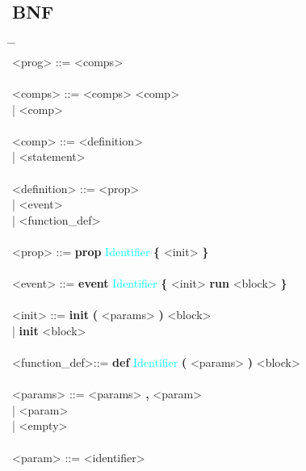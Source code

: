 \documentclass{Dokumentmall}
\begin{document}
\subsection{BNF}

\begin{tabbing}
  \= {} {} {} {} {} {} {} {} {} {} {} {} {} {} {} {} {} {} {} {} {} {} {} {} {} {} {} \= {} {} {} {} {} {} {} {} {} {} {} {} {} {} {} {} {} {}\= \\
  \><prog> \>::= \><comps> \\\\
  \><comps>  \>::= \><comps> <comp>\\
  \> \> | \> <comp> \\\\

  \><comp> \>::= \><definition>\\
  \> \>| \><statement>\\\\

  \><definition> \>::= \><prop>\\
  \> \>| \> <event> \\
  \> \>| \> <function\_def>\\\\

  \><prop> \>::= \>\textbf{prop} \textcolor{Cyan}{Identifier} \textbf{\{} <init> \textbf{\}}\\\\

  \><event> \>::= \>\textbf{event} \textcolor{Cyan}{Identifier} \textbf{\{} <init> \textbf{run} <block> \textbf{\}}\\\\

  \><init> \>::= \>\textbf{init} \textbf{(} <params> \textbf{)} <block>\\
  \> \>| \> \textbf{init} <block>\\\\

  \><function\_def>\>::= \>\textbf{def} \textcolor{Cyan}{Identifier} \textbf{(} <params> \textbf{)} <block>\\\\

  \><params> \>::= \><params> \textbf{,} <param>\\
  \> \>| \> <param>\\
  \> \>| \> <empty>\\\\

  \><param> \>::= \><identifier>\\\\


\end{tabbing}
\end{document}
